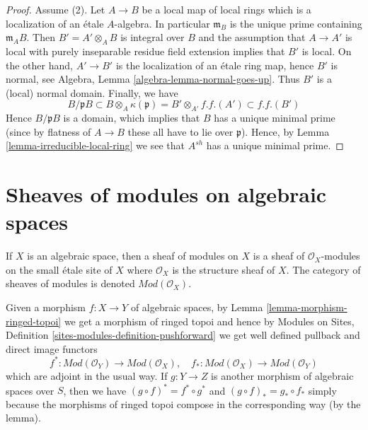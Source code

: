 \begin{proof}
\medskip\noindent
Assume (2). Let $A \to B$ be a local map of local rings which is a
localization of an \'etale $A$-algebra. In particular $\mathfrak m_B$
is the unique prime containing $\mathfrak m_AB$. Then $B' = A' \otimes_A B$
is integral over $B$ and the assumption that $A \to A'$ is local
with purely inseparable residue field extension implies that $B'$
is local. On the other hand, $A' \to B'$ is the localization
of an \'etale ring map, hence $B'$ is normal, see
Algebra, Lemma \ref{algebra-lemma-normal-goes-up}.
Thus $B'$ is a (local) normal domain. Finally, we have
$$
B/\mathfrak pB \subset B \otimes_A \kappa(\mathfrak p)
= B' \otimes_{A'} f.f.(A') \subset f.f.(B')
$$
Hence $B/\mathfrak pB$ is a domain, which implies that $B$ has a unique
minimal prime (since by flatness of $A \to B$ these all have to lie
over $\mathfrak p$). Hence, by
Lemma \ref{lemma-irreducible-local-ring}
we see that $A^{sh}$ has a unique minimal prime.
\end{proof}













\section{Sheaves of modules on algebraic spaces}
\label{section-modules}

\noindent
If $X$ is an algebraic space, then a sheaf of modules on $X$ is
a sheaf of $\mathcal{O}_X$-modules on the small \'etale site of $X$
where $\mathcal{O}_X$ is the structure sheaf of $X$. The category
of sheaves of modules is denoted $\textit{Mod}(\mathcal{O}_X)$.

\medskip\noindent
Given a morphism $f : X \to Y$ of algebraic spaces, by
Lemma \ref{lemma-morphism-ringed-topoi}
we get a morphism of ringed topoi and hence by
Modules on Sites, Definition \ref{sites-modules-definition-pushforward}
we get well defined pullback and direct image functors
\begin{equation}
\label{equation-push-pull}
f^* :
\textit{Mod}(\mathcal{O}_Y)
\longrightarrow
\textit{Mod}(\mathcal{O}_X), \quad
f_* :
\textit{Mod}(\mathcal{O}_X)
\longrightarrow
\textit{Mod}(\mathcal{O}_Y)
\end{equation}
which are adjoint in the usual way. If $g : Y \to Z$ is another morphism
of algebraic spaces over $S$, then we have
$(g \circ f)^* = f^* \circ g^*$ and $(g \circ f)_* = g_* \circ f_*$
simply because the morphisms of ringed topoi compose in the corresponding
way (by the lemma).


